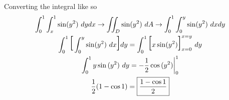 \documentclass{article}
\begin{document}
  Converting the integral like so
  \[
    \begin{gathered}
    \int^{1}_{0} \int^{1}_{x} \sin(y^{2}) ~ dydx \to \iint_D \sin(y^{2})~dA \to \int^{1}_{0} \int^{y}_{0} \sin(y^{2}) ~dxdy\\
    \int^{1}_{0} \text{\huge{[}} \int^{y}_{0} \sin(y^{2})~dx \text{\huge{]}} dy = \int^{1}_{0} \text{\huge{[}} x\sin(y^{2}) \text{\huge{]}}^{x=y}_{x=0}~dy\\
    \int^{1}_{0} y\sin{(y^{2})}~dy = -\frac{1}{2}\cos{(y^{2})} \bigg|^{1}_{0}\\
    \frac{1}{2}(1-\cos{1})=\boxed{\frac{1-\cos{1}}{2}} 
    \end{gathered}
  \]
  
  
  
  

  
\end{document}
